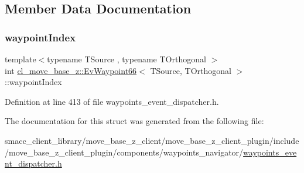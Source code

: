 \subsection{Member Data Documentation}
\mbox{\label{structcl__move__base__z_1_1EvWaypoint66_a7f7b990c18962fa35f1b20b2bf5829aa}} 
\subsubsection{\texorpdfstring{waypoint\+Index}{waypointIndex}}
{\footnotesize\ttfamily template$<$typename T\+Source , typename T\+Orthogonal $>$ \\
int \hyperlink{structcl__move__base__z_1_1EvWaypoint66}{cl\+\_\+move\+\_\+base\+\_\+z\+::\+Ev\+Waypoint66}$<$ T\+Source, T\+Orthogonal $>$\+::waypoint\+Index}



Definition at line 413 of file waypoints\+\_\+event\+\_\+dispatcher.\+h.



The documentation for this struct was generated from the following file\+:\begin{DoxyCompactItemize}
\item 
smacc\+\_\+client\+\_\+library/move\+\_\+base\+\_\+z\+\_\+client/move\+\_\+base\+\_\+z\+\_\+client\+\_\+plugin/include/move\+\_\+base\+\_\+z\+\_\+client\+\_\+plugin/components/waypoints\+\_\+navigator/\hyperlink{waypoints__event__dispatcher_8h}{waypoints\+\_\+event\+\_\+dispatcher.\+h}\end{DoxyCompactItemize}

